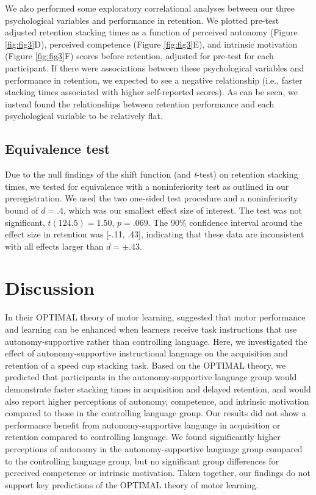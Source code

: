 \documentclass[man,floatsintext,donotrepeattitle,letterpaper,12pt]{apa7}
\begin{document}
\clearpage

We also performed some exploratory correlational analyses between our three psychological variables and performance in retention. We plotted pre-test adjusted retention stacking times as a function of perceived autonomy (Figure \ref{fig:fig3}D), perceived competence (Figure \ref{fig:fig3}E), and intrinsic motivation (Figure \ref{fig:fig3}F) scores before retention, adjusted for pre-test for each participant. If there were associations between these psychological variables and performance in retention, we expected to see a negative relationship (i.e., faster stacking times associated with higher self-reported scores). As can be seen, we instead found the relationships between retention performance and each psychological variable to be relatively flat.

\subsection{Equivalence test}

Due to the null findings of the shift function (and \emph{t}-test) on retention stacking times, we tested for equivalence with a noninferiority test as outlined in our preregistration. We used the two one-sided test procedure \autocite{schuirmann1987} and a noninferiority bound of $d = .4$, which was our smallest effect size of interest. The test was not significant, $t(124.5) = 1.50$, $p = .069$. The 90\% confidence interval around the effect size in retention was [-.11, .43], indicating that these data are inconsistent with all effects larger than $d = \pm.43$.

\section{Discussion}

In their OPTIMAL theory of motor learning, \textcite{wulf2016} suggested that motor performance and learning can be enhanced when learners receive task instructions that use autonomy-supportive rather than controlling language. Here, we investigated the effect of autonomy-supportive instructional language on the acquisition and retention of a speed cup stacking task. Based on the OPTIMAL theory, we predicted that participants in the autonomy-supportive language group would demonstrate faster stacking times in acquisition and delayed retention, and would also report higher perceptions of autonomy, competence, and intrinsic motivation compared to those in the controlling language group. Our results did not show a performance benefit from autonomy-supportive language in acquisition or retention compared to controlling language. We found significantly higher perceptions of autonomy in the autonomy-supportive language group compared to the controlling language group, but no significant group differences for perceived competence or intrinsic motivation. Taken together, our findings do not support key predictions of the OPTIMAL theory of motor learning.
\end{document}

